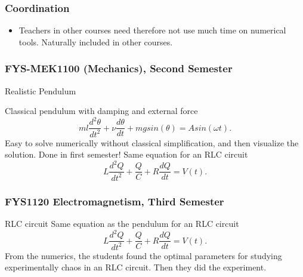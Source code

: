 \documentclass{beamer}
\begin{document}
\begin{frame}
\frametitle{Coordination}

\begin{block}{}
\begin{itemize}
\item Teachers in other courses need therefore not use much time on numerical tools. Naturally included in other courses.
\end{itemize}

\noindent
\end{block}
\end{frame}

\begin{frame}
\frametitle{FYS-MEK1100 (Mechanics), Second Semester}

\begin{block}{Realistic Pendulum }

Classical pendulum with damping and external force
\[
  ml\frac{d^2\theta}{dt^2}+\nu\frac{d\theta}{dt}  +mgsin(\theta)=Asin(\omega t).
\]
Easy to solve numerically without classical simplification, and then visualize the solution.  Done in first semester!
Same equation for an RLC circuit 
\[
L\frac{d^2Q}{dt^2}+\frac{Q}{C}+R\frac{dQ}{dt}=V(t).
\]
\end{block}
\end{frame}

\begin{frame}
\frametitle{FYS1120 Electromagnetism, Third Semester}

\begin{block}{RLC circuit }
Same equation as the pendulum for an RLC circuit 
\[
L\frac{d^2Q}{dt^2}+\frac{Q}{C}+R\frac{dQ}{dt}=V(t).
\]
From the numerics, 
the students found the optimal parameters for studying experimentally chaos
in an RLC circuit. Then they did the experiment.

\end{block}
\end{frame}
\end{document}
